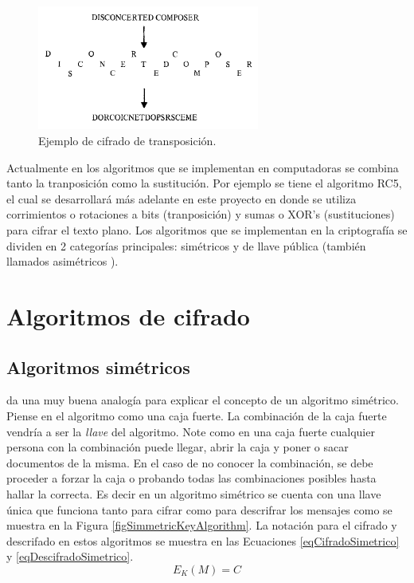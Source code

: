 \begin{figure}
	\centering
	\includegraphics[width=0.65\textwidth]{./images/figExampleTranspositionCipher}
	\caption{Ejemplo de cifrado de transposición.}
	\label{figExampleTranspositionCipher}
\end{figure}


Actualmente en los algoritmos que se implementan en computadoras se combina tanto la tranposición como la sustitución. Por ejemplo se tiene el algoritmo RC5, el cual se desarrollará más adelante en este proyecto en donde se utiliza corrimientos o rotaciones a bits (tranposición) y sumas o XOR's (sustituciones) para cifrar el texto plano. Los algoritmos que se implementan en la criptografía se dividen en 2 categorías principales: simétricos y de llave pública (también llamados asimétricos \cite{???}).


\section{Algoritmos de cifrado}
\subsection{Algoritmos simétricos}
\cite{bruce} da una muy buena analogía para explicar el concepto de un algoritmo simétrico. Piense en el algoritmo como una caja fuerte. La combinación de la caja fuerte vendría a ser la \textit{llave} del algoritmo. Note como en una caja fuerte cualquier persona con la combinación puede llegar, abrir la caja y poner o sacar documentos de la misma. En el caso de no conocer la combinación, se debe proceder a forzar la caja o probando todas las combinaciones posibles hasta hallar la correcta. Es decir en un algoritmo simétrico se cuenta con una llave única que funciona tanto para cifrar como para descrifrar los mensajes como se muestra en la Figura \ref{figSimmetricKeyAlgorithm}. La notación para el cifrado y descrifado en estos algoritmos se muestra en las Ecuaciones \ref{eqCifradoSimetrico} y \ref{eqDescifradoSimetrico}.
\begin{equation}\label{eqCifradoSimetrico}
E_K (M) = C
\end{equation}

